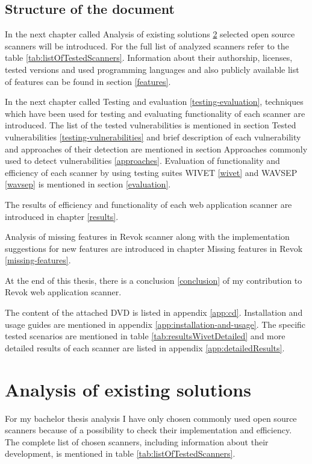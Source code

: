 	\section{Structure of the document}
	
	In the next chapter called Analysis of existing solutions \ref{analysis} selected open source scanners will be introduced. For the full list of analyzed scanners refer to the table \ref{tab:listOfTestedScanners}. Information about their authorship, licenses, tested versions and used programming languages and also publicly available list of features can be found in section \ref{features}.
	
	In the next chapter called Testing and evaluation \ref{testing-evaluation}, techniques which have been used for testing and evaluating functionality of each scanner are introduced. The list of the tested vulnerabilities is mentioned in section Tested vulnerabilities \ref{testing-vulnerabilities} and brief description of each vulnerability and approaches of their detection are mentioned in section Approaches commonly used to detect vulnerabilities \ref{approaches}. Evaluation of functionality and efficiency of each scanner by using testing suites WIVET \ref{wivet} and WAVSEP \ref{wavsep} is mentioned in section \ref{evaluation}.
	
	The results of efficiency and functionality of each web application scanner are introduced in chapter \ref{results}.	
	
	Analysis of missing features in Revok scanner along with the implementation suggestions for new features are introduced in chapter Missing features in Revok \ref{missing-features}.
	
	At the end of this thesis, there is a conclusion \ref{conclusion} of my contribution to Revok web application scanner.
	
	The content of the attached DVD is listed in appendix \ref{app:cd}. Installation and usage guides are mentioned in appendix \ref{app:installation-and-usage}. The specific tested scenarios are mentioned in table \ref{tab:resultsWivetDetailed} and more detailed results of each scanner are listed in appendix \ref{app:detailedResults}.
	
	\newpage
	
	
\chapter{Analysis of existing solutions}\label{analysis}

	For my bachelor thesis analysis I have only chosen commonly used open source scanners because of a possibility to check their implementation and efficiency. The complete list of chosen scanners, including information about their development, is mentioned in table \ref{tab:listOfTestedScanners}.

